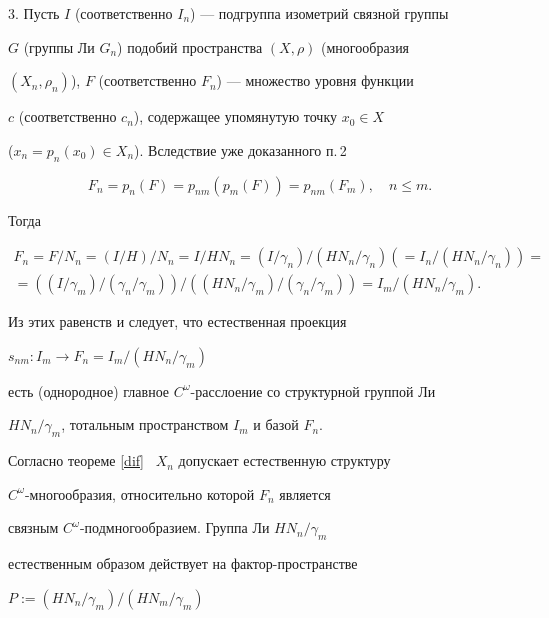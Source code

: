 \begin{pf}
3. Пусть $I$ (соответственно $I_{n}$) --- подгруппа изометрий связной группы


$G$ (группы Ли $G_{n}$) подобий пространства $(X,\rho)$ (многообразия


$(X_{n},\rho_{n})$), $F$ (соответственно $F_{n}$) --- множество уровня функции


$c$ (соответственно $c_{n}$), содержащее упомянутую точку $x_{0} \in X$


($x_{n}=p_{n}(x_{0}) \in X_{n}$). Вследствие уже доказанного п.\,2


\begin{equation}


\label{F}


F_{n}=p_{n}(F)=p_{nm}(p_{m}(F))=p_{nm}(F_{m}),\quad n \leq m.


\end{equation}


Тогда


\begin{gather*}


F_{n}=F/N_{n}=(I/H)/N_{n}=I/HN_{n}=


(I/\gamma_{n})/(HN_{n}/\gamma_{n}) (=


I_{n}/(HN_{n}/\gamma_{n}))= \\


=((I/\gamma_{m})/(\gamma_{n}/\gamma_{m}))/


((HN_{n}/\gamma_{m})/(\gamma_{n}/\gamma_{m}))=


I_{m}/(HN_{n}/\gamma_{m}).


\end{gather*}


Из этих равенств и \cite{St} следует, что естественная проекция


$s_{nm}:I_{m}\rightarrow F_{n}=I_{m}/(HN_{n}/\gamma_{m})$


есть (однородное) главное $C^{\omega}$-расслоение со структурной группой Ли


$HN_{n}/\gamma_{m}$, тотальным пространством $I_{m}$ и базой $F_{n}$.


Согласно теореме \ref{dif} \ $X_{n}$ допускает естественную структуру\linebreak


$C^{\omega}$-мно\-гообразия, относительно которой $F_{n}$ является


связным $C^{\omega}$-подмногообразием. Группа Ли $HN_{n}/\gamma_{m}$ 


естественным образом действует на фактор-пространстве


$P:=(HN_{n}/\gamma_{m})/(HN_{m}/\gamma_{m})$



\end{pf}
